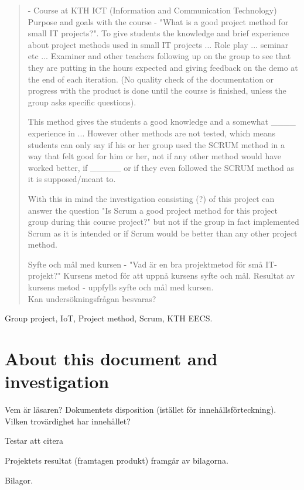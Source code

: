 
\begin{abstract}
- Course at KTH ICT (Information and Communication Technology) 
Purpose and goals with the course - "What is a good project method for small IT projects?". To give students the knowledge and brief experience about project methods used in small IT projects ... Role play ... seminar etc ... Examiner and other teachers following up on the group to see that they are putting in the hours expected and giving feedback on the demo at the end of each iteration. (No quality check of the documentation or progress with the product is done until the course is finished, unless the group asks specific questions). 

This method gives the students a good knowledge and a somewhat ____ experience in ... However other methods are not tested, which means students can only say if his or her group used the SCRUM method in a way that felt good for him or her, not if any other method would have worked better, if _____ or if they even followed the SCRUM method as it is supposed/meant to. 

With this in mind the investigation consisting (?) of this project can answer the question "Is Scrum a good project method for this project group during this course project?" but not if the group in fact implemented Scrum as it is intended or if Scrum would be better than any other project method. 




Syfte och mål med kursen - "Vad är en bra projektmetod för små IT-projekt?" Kursens metod för att uppnå
kursens syfte och mål. Resultat av kursens metod - uppfylls syfte och mål med kursen.\\
Kan undersökningsfrågan besvaras?






\end{abstract}

\begin{IEEEkeywords}
Group project, IoT, Project method, Scrum, KTH EECS. 
\end{IEEEkeywords}

\section{About this document and investigation}
Vem är läsaren? Dokumentets disposition (istället för innehållsförteckning). Vilken trovärdighet har innehållet?

Testar att citera \cite{noauthor_hallbar_nodate}

Projektets resultat (framtagen produkt) framgår av bilagorna.

Bilagor.
